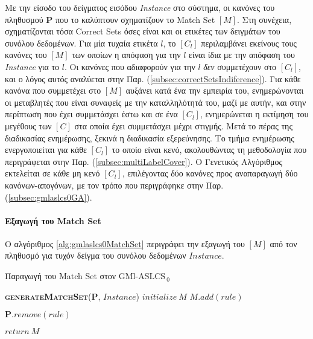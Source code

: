 Με την είσοδο του δείγματος εισόδου \emph{Instance} στο σύστημα, οι κανόνες του πληθυσμού \textbf{P} που το καλύπτουν σχηματίζουν το Match Set $[M]$. Στη συνέχεια, σχηματίζονται τόσα Correct Sets όσες είναι και οι ετικέτες των δειγμάτων του συνόλου δεδομένων. Για μία τυχαία ετικέτα $l$, το $[C_{l}]$ περιλαμβάνει εκείνους τους κανόνες του $[M]$ των οποίων η απόφαση για την $l$ είναι ίδια με την απόφαση του \emph{Instance} για το $l$. Οι κανόνες που αδιαφορούν για την $l$ \emph{δεν} συμμετέχουν στο $[C_{l}]$, και ο λόγος αυτός αναλύεται στην Παρ. (\ref{subsec:correctSetsIndiference}). Για κάθε κανόνα που συμμετέχει στο $[M]$ αυξάνει κατά ένα την εμπειρία του, ενημερώνονται οι μεταβλητές που είναι συναφείς με την καταλληλότητά του, μαζί με αυτήν, και στην περίπτωση που έχει συμμετάσχει έστω και σε ένα $[C_{l}]$, ενημερώνεται η εκτίμηση του μεγέθους των $[C]$ στα οποία έχει συμμετάσχει μέχρι στιγμής. Μετά το πέρας της διαδικασίας ενημέρωσης, ξεκινά η διαδικασία εξερεύνησης. Το τμήμα ενημέρωσης ενεργοποιείται για κάθε $[C_{l}]$ το οποίο είναι κενό, ακολουθώντας τη μεθοδολογία που περιγράφεται στην Παρ. (\ref{subsec:multiLabelCover}). Ο Γενετικός Αλγόριθμος εκτελείται σε κάθε μη κενό $[C_{l}]$, επιλέγοντας δύο κανόνες προς αναπαραγωγή δύο κανόνων-απογόνων, με τον τρόπο που περιγράφηκε στην Παρ. (\ref{subsec:gmlaslcs0GA}).



\paragraph{Εξαγωγή του Match Set}


Ο αλγόριθμος \ref{alg:gmlaslcs0MatchSet} περιγράφει την εξαγωγή του $[M]$ από τον πληθυσμό για τυχόν δείγμα του συνόλου δεδομένων $Instance$.

\begin{algorithm} 
 \caption{Παραγωγή του Match Set στον GMl-ASLCS$_{\:0}$}
\label{alg:gmlaslcs0MatchSet}
 \begin{algorithmic}[1]
  	\STATE \textbf{\textsc{generateMatchSet}}($\textbf{P}$, $Instance$)
  	\STATE $initialize \: M$
  			\STATE $M.add(rule)$
  		\ENDIF	
  	\ENDFOR
  	
			\STATE $\textbf{P}.remove(rule)$
		\ENDIF
  	\ENDFOR
  	

	\STATE $return \: M$
 \end{algorithmic}
\end{algorithm}

